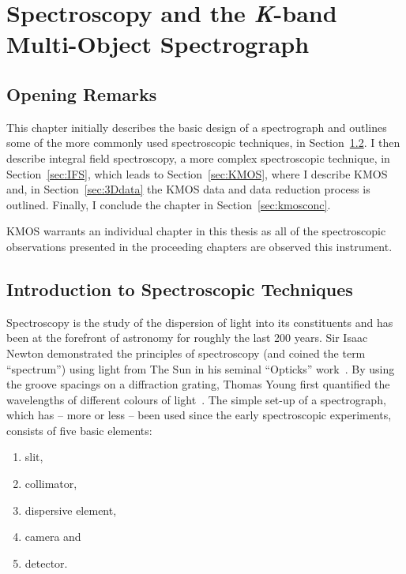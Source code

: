 \chapter{Spectroscopy and the {\it K}-band Multi-Object Spectrograph}
\label{ch:kmos}
\renewcommand{\headrulewidth}{1pt}

\section{Opening Remarks} %
\label{sec:opening_remarks}
This chapter initially describes the basic design of a spectrograph and outlines some of the more commonly used spectroscopic techniques, in Section~\ref{sec:intro_to_spec}.
I then describe integral field spectroscopy, a more complex spectroscopic technique, in Section~\ref{sec:IFS}, which leads to Section~\ref{sec:KMOS}, where I describe KMOS and, in Section~\ref{sec:3Ddata} the KMOS data  and data reduction process is outlined.
Finally, I conclude the chapter in Section~\ref{sec:kmosconc}.

KMOS warrants an individual chapter in this thesis as all of the spectroscopic observations presented in the proceeding chapters are observed this instrument.


\section{Introduction to Spectroscopic Techniques} %
\label{sec:intro_to_spec}

Spectroscopy is the study of the dispersion of light into its constituents and has been at the forefront of astronomy for roughly the last 200 years.
Sir Isaac Newton demonstrated the principles of spectroscopy (and coined the term ``spectrum'') using light from The Sun in his seminal ``Opticks'' work~\citep{b:Newton}.
By using the groove spacings on a diffraction grating, Thomas Young first quantified the wavelengths of different colours of light~\citep{1802PTRSL.92.12Y}.
The simple set-up of a spectrograph, which has -- more or less -- been used since the early spectroscopic experiments, consists of five basic elements:

\begin{enumerate}
    \item slit,
    \item collimator,
    \item dispersive element,
    \item camera and
    \item detector.
\end{enumerate}

